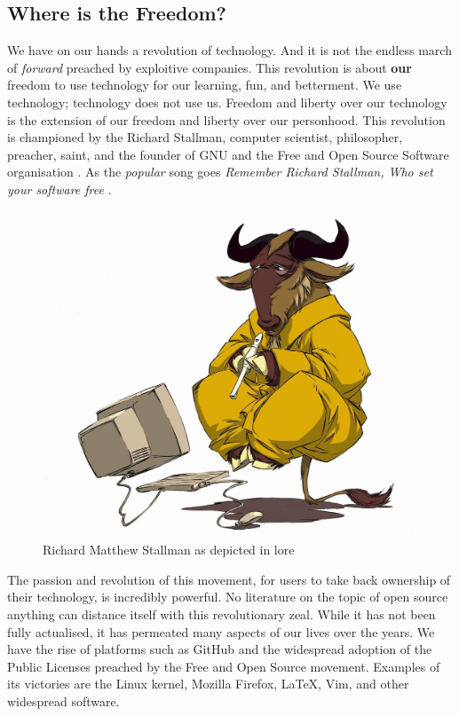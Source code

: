 \documentclass{article}
\begin{document}
\subsection{Where is the Freedom?}
We have on our hands a revolution of technology. 
And it is not the endless march of \textit{forward} preached by exploitive companies.
This revolution is about \textbf{our} freedom to use technology for our learning, fun, and betterment.
We use technology; technology does not use us. 
Freedom and liberty over our technology is the extension of our freedom and liberty over our personhood.
This revolution is championed by the Richard Stallman, computer scientist, philosopher, preacher, saint, and the founder of GNU and the Free and Open Source Software organisation \cite{b0_stallman}.
As the \textit{popular} song goes \textit{Remember Richard Stallman,
Who set your software free} \cite{song_GNUs_Not_Unix}.

\begin{figure}[h]
    \centering
    \includegraphics[width=\textwidth]{the_wise_gnu.jpg}
    \caption{Richard Matthew Stallman as depicted in lore}
    \label{fig:rms}
\end{figure}

The passion and revolution of this movement, for users to take back ownership of their technology, is incredibly powerful. 
No literature on the topic of open source anything can distance itself with this revolutionary zeal. 
While it has not been fully actualised, it has permeated many aspects of our lives over the years.
We have the rise of platforms such as GitHub and the widespread adoption of the Public Licenses preached by the Free and Open Source movement. 
Examples of its victories are the Linux kernel, Mozilla Firefox, \LaTeX, Vim, and other widespread software. 
\end{document}
